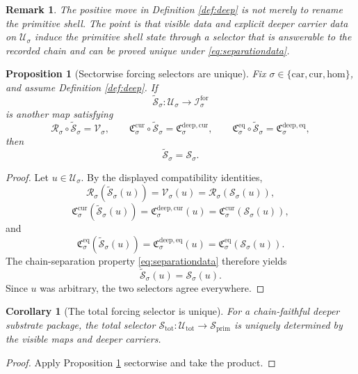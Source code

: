 \documentclass[11pt]{article}
\newcommand{\Car}{\mathrm{car}}
\newcommand{\Cur}{\mathrm{cur}}
\newcommand{\Hom}{\mathrm{hom}}
\newcommand{\ForSpace}[1]{\mathcal I_{#1}^{\mathrm{for}}}
\newcommand{\PrimShell}{\mathcal S_{\mathrm{prim}}}
\newcommand{\Reduction}[1]{\mathcal R_{#1}}
\newcommand{\CurrentCarrier}[1]{\mathfrak C_{#1}^{\mathrm{cur}}}
\newcommand{\EqCarrier}[1]{\mathfrak C_{#1}^{\mathrm{eq}}}
\newcommand{\DeepSpace}[1]{\mathcal U_{#1}}
\newcommand{\DeepShell}{\mathcal U_{\mathrm{tot}}}
\newcommand{\VisibleMap}[1]{\mathcal V_{#1}}
\newcommand{\DeepCurrentCarrier}[1]{\mathfrak C_{#1}^{\mathrm{deep,cur}}}
\newcommand{\DeepEqCarrier}[1]{\mathfrak C_{#1}^{\mathrm{deep,eq}}}
\newcommand{\ChainSelect}[1]{\mathcal S_{#1}}
\newcommand{\ChainSelectTriple}{\mathcal S_{\mathrm{tot}}}
\newtheorem{proposition}{Proposition}
\newtheorem{remark}{Remark}
\newtheorem{corollary}{Corollary}
\begin{document}
\begin{remark}
The positive move in Definition \ref{def:deep} is not merely to rename the primitive shell. The point is that visible data and explicit deeper carrier data on \(\DeepSpace{\sigma}\) induce the primitive shell state through a selector that is answerable to the recorded chain and can be proved unique under \eqref{eq:separationdata}.
\end{remark}

\begin{proposition}[Sectorwise forcing selectors are unique]
\label{prop:selector_unique}
Fix \(\sigma\in\{\Car,\Cur,\Hom\}\), and assume Definition \ref{def:deep}. If
\[
\widetilde{\mathcal S}_{\sigma}:\DeepSpace{\sigma}\to\ForSpace{\sigma}
\]
is another map satisfying
\[
\Reduction{\sigma}\circ\widetilde{\mathcal S}_{\sigma}
=
\VisibleMap{\sigma},
\qquad
\CurrentCarrier{\sigma}\circ\widetilde{\mathcal S}_{\sigma}
=
\DeepCurrentCarrier{\sigma},
\qquad
\EqCarrier{\sigma}\circ\widetilde{\mathcal S}_{\sigma}
=
\DeepEqCarrier{\sigma},
\]
then
\[
\widetilde{\mathcal S}_{\sigma}=\ChainSelect{\sigma}.
\]
\end{proposition}

\begin{proof}
Let \(u\in\DeepSpace{\sigma}\). By the displayed compatibility identities,
\[
\Reduction{\sigma}(\widetilde{\mathcal S}_{\sigma}(u))
=
\VisibleMap{\sigma}(u)
=
\Reduction{\sigma}(\ChainSelect{\sigma}(u)),
\]
\[
\CurrentCarrier{\sigma}(\widetilde{\mathcal S}_{\sigma}(u))
=
\DeepCurrentCarrier{\sigma}(u)
=
\CurrentCarrier{\sigma}(\ChainSelect{\sigma}(u)),
\]
and
\[
\EqCarrier{\sigma}(\widetilde{\mathcal S}_{\sigma}(u))
=
\DeepEqCarrier{\sigma}(u)
=
\EqCarrier{\sigma}(\ChainSelect{\sigma}(u)).
\]
The chain-separation property \eqref{eq:separationdata} therefore yields
\[
\widetilde{\mathcal S}_{\sigma}(u)=\ChainSelect{\sigma}(u).
\]
Since \(u\) was arbitrary, the two selectors agree everywhere.
\end{proof}

\begin{corollary}[The total forcing selector is unique]
\label{cor:selector_total}
For a chain-faithful deeper substrate package, the total selector \(\ChainSelectTriple:\DeepShell\to\PrimShell\) is uniquely determined by the visible maps and deeper carriers.
\end{corollary}

\begin{proof}
Apply Proposition \ref{prop:selector_unique} sectorwise and take the product.
\end{proof}
\end{document}
